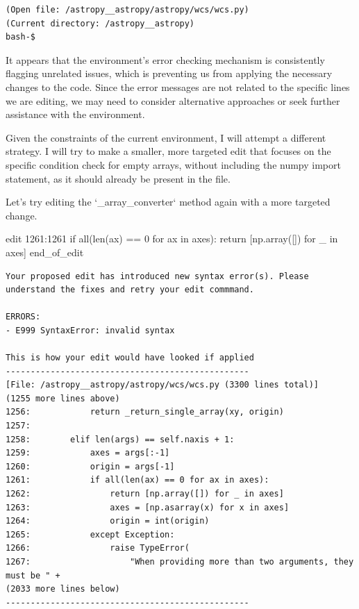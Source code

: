 {\begin{observationbox}
\begin{Verbatim}[breaklines=true, breakanywhere=true]
(Open file: /astropy__astropy/astropy/wcs/wcs.py)
(Current directory: /astropy__astropy)
bash-$
\end{Verbatim}
\end{observationbox}
\begin{agentbox}
It appears that the environment's error checking mechanism is consistently flagging unrelated issues, which is preventing us from applying the necessary changes to the code. Since the error messages are not related to the specific lines we are editing, we may need to consider alternative approaches or seek further assistance with the environment.



Given the constraints of the current environment, I will attempt a different strategy. I will try to make a smaller, more targeted edit that focuses on the specific condition check for empty arrays, without including the numpy import statement, as it should already be present in the file.



Let's try editing the `\_array\_converter` method again with a more targeted change.

\hrulefill
\begin{CodeVerbatim}[breaklines=true, breakanywhere=true]
edit 1261:1261
            if all(len(ax) == 0 for ax in axes):
                return [np.array([]) for _ in axes]
end_of_edit
\end{CodeVerbatim}
\end{agentbox}
\begin{observationbox}\begin{Verbatim}[breaklines=true, breakanywhere=true]
Your proposed edit has introduced new syntax error(s). Please understand the fixes and retry your edit commmand.

ERRORS:
- E999 SyntaxError: invalid syntax

This is how your edit would have looked if applied
-------------------------------------------------
[File: /astropy__astropy/astropy/wcs/wcs.py (3300 lines total)]
(1255 more lines above)
1256:            return _return_single_array(xy, origin)
1257:
1258:        elif len(args) == self.naxis + 1:
1259:            axes = args[:-1]
1260:            origin = args[-1]
1261:            if all(len(ax) == 0 for ax in axes):
1262:                return [np.array([]) for _ in axes]
1263:                axes = [np.asarray(x) for x in axes]
1264:                origin = int(origin)
1265:            except Exception:
1266:                raise TypeError(
1267:                    "When providing more than two arguments, they must be " +
(2033 more lines below)
-------------------------------------------------


\end{Verbatim}
\end{observationbox}}
